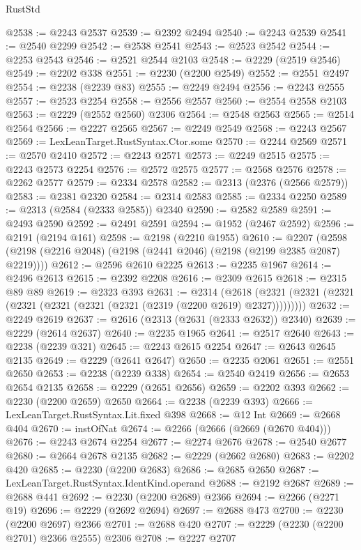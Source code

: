 \begin{lexlean}{RustStd}
\begin{coremodule}
@2538 := @2243 @2537
@2539 := @2392 @2494
@2540 := @2243 @2539
@2541 := @2540 @2299
@2542 := @2538 @2541
@2543 := @2523 @2542
@2544 := @2253 @2543
@2546 := @2521 @2544 @2103
@2548 := @2229 (@2519 @2546)
@2549 := @2202 @338
@2551 := @2230 (@2200 @2549)
@2552 := @2551 @2497
@2554 := @2238 (@2239 @83)
@2555 := @2249 @2494
@2556 := @2243 @2555
@2557 := @2523 @2254
@2558 := @2556 @2557
@2560 := @2554 @2558 @2103
@2563 := @2229 (@2552 @2560) @2306
@2564 := @2548 @2563
@2565 := @2514 @2564
@2566 := @2227 @2565
@2567 := @2249 @2549
@2568 := @2243 @2567
@2569 := LexLeanTarget.RustSyntax.Ctor.some
@2570 := @2244 @2569
@2571 := @2570 @2410
@2572 := @2243 @2571
@2573 := @2249 @2515
@2575 := @2243 @2573 @2254
@2576 := @2572 @2575
@2577 := @2568 @2576
@2578 := @2262 @2577
@2579 := @2334 @2578
@2582 := @2313 (@2376 (@2566 @2579))
@2583 := @2381 @2320
@2584 := @2314 @2583
@2585 := @2334 @2250
@2589 := @2313 (@2584 (@2333 @2585)) @2340
@2590 := @2582 @2589
@2591 := @2493 @2590
@2592 := @2491 @2591
@2594 := @1952 (@2467 @2592)
@2596 := @2191 (@2194 @161)
@2598 := @2198 (@2210 @1955)
@2610 := @2207 (@2598 (@2198 (@2216 @2048) (@2198 (@2441 @2046) (@2198 (@2199 @2385 @2087) @2219))))
@2612 := @2596 @2610 @2225
@2613 := @2235 @1967
@2614 := @2496 @2613
@2615 := @2392 @2208
@2616 := @2309 @2615
@2618 := @2315 @89 @89
@2619 := @2323 @393
@2631 := @2314
    (@2618 (@2321 (@2321 (@2321 (@2321 (@2321 (@2321 (@2321 (@2319 (@2200 @2619) @2327)))))))))
@2632 := @2249 @2619
@2637 := @2616 (@2313 (@2631 (@2333 @2632)) @2340)
@2639 := @2229 (@2614 @2637)
@2640 := @2235 @1965
@2641 := @2517 @2640
@2643 := @2238 (@2239 @321)
@2645 := @2243 @2615 @2254
@2647 := @2643 @2645 @2135
@2649 := @2229 (@2641 @2647)
@2650 := @2235 @2061
@2651 := @2551 @2650
@2653 := @2238 (@2239 @338)
@2654 := @2540 @2419
@2656 := @2653 @2654 @2135
@2658 := @2229 (@2651 @2656)
@2659 := @2202 @393
@2662 := @2230 (@2200 @2659) @2650
@2664 := @2238 (@2239 @393)
@2666 := LexLeanTarget.RustSyntax.Lit.fixed @398
@2668 := @12 Int
@2669 := @2668 @404
@2670 := instOfNat
@2674 := @2266 (@2666 (@2669 (@2670 @404)))
@2676 := @2243 @2674 @2254
@2677 := @2274 @2676
@2678 := @2540 @2677
@2680 := @2664 @2678 @2135
@2682 := @2229 (@2662 @2680)
@2683 := @2202 @420
@2685 := @2230 (@2200 @2683)
@2686 := @2685 @2650
@2687 := LexLeanTarget.RustSyntax.IdentKind.operand
@2688 := @2192 @2687
@2689 := @2688 @441
@2692 := @2230 (@2200 @2689) @2366
@2694 := @2266 (@2271 @19)
@2696 := @2229 (@2692 @2694)
@2697 := @2688 @473
@2700 := @2230 (@2200 @2697) @2366
@2701 := @2688 @420
@2707 := @2229 (@2230 (@2200 @2701) @2366 @2555) @2306
@2708 := @2227 @2707

\end{coremodule}
\end{lexlean}
